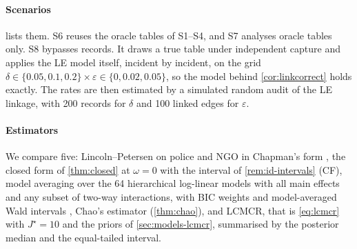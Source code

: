\paragraph{Scenarios}  lists them. S6 reuses the oracle tables of S1--S4, and S7 analyses oracle tables only. S8 bypasses records. It draws a true table under independent capture and applies the LE model itself, incident by incident, on the grid $\delta\in\{0.05,0.1,0.2\}\times\varepsilon\in\{0,0.02,0.05\}$, so the model behind \cref{cor:linkcorrect} holds exactly. The rates are then estimated by a simulated random audit of the LE linkage, with 200 records for $\delta$ and 100 linked edges for $\varepsilon$.

\paragraph{Estimators} We compare five: Lincoln--Petersen on police and NGO in Chapman's form \citep[LP;][]{chapman1951}, the closed form of \cref{thm:closed} at $\omega=0$ with the interval of \cref{rem:id-intervals} (CF), model averaging over the 64 hierarchical log-linear models with all main effects and any subset of two-way interactions, with BIC weights and model-averaged Wald intervals \citep[BMA;][]{turek2012}, Chao's estimator (\cref{thm:chao}), and LCMCR, that is \eqref{eq:lcmcr} with $J^\star=10$ and the priors of \cref{sec:models-lcmcr}, summarised by the posterior median and the equal-tailed interval.

